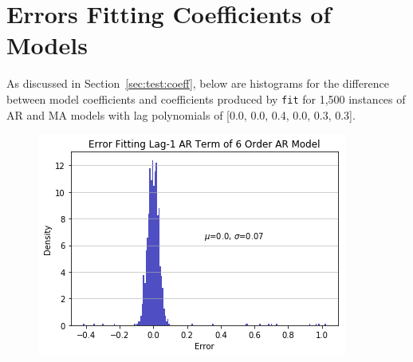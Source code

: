 \documentclass[oneside,12pt,openany]{book}
\begin{document}
    
    
    
    
    
    
    
    
    
	\appendices
		\chapter{Errors Fitting Coefficients of Models}\label{app:errors}
        
        As discussed in Section~\ref{sec:test:coeff}, below are histograms for the difference between model coefficients and coefficients produced by \texttt{fit} for 1,500 instances of AR and MA models with lag polynomials of [0.0, 0.0, 0.4, 0.0, 0.3, 0.3].
	
	\begin{figure}[hbt!]
		\centering
		\includegraphics[width=.85\linewidth]{images/AR6ModelAR1CoefDist.png}
	\end{figure}
\end{document}
